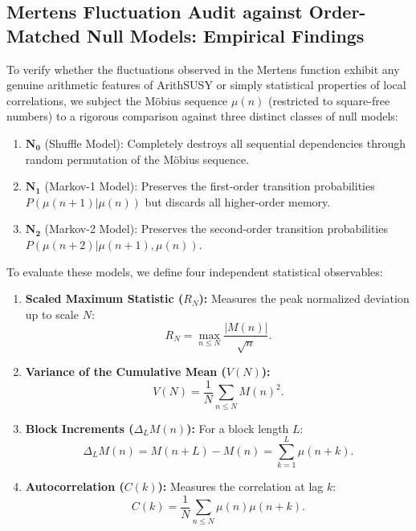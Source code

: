 \documentclass[11pt,a4paper]{article}
\theoremstyle{definition}
\begin{document}
	\subsection{Mertens Fluctuation Audit against Order-Matched Null Models: Empirical Findings}
	To verify whether the fluctuations observed in the Mertens function exhibit any genuine arithmetic features of ArithSUSY or simply statistical properties of local correlations, we subject the Möbius sequence $\mu(n)$ (restricted to square-free numbers) to a rigorous comparison against three distinct classes of null models:
	\begin{enumerate}
		\item $\mathbf{N_0}$ (Shuffle Model): Completely destroys all sequential dependencies through random permutation of the Möbius sequence.
		\item $\mathbf{N_1}$ (Markov-1 Model): Preserves the first-order transition probabilities $P(\mu(n+1) | \mu(n))$ but discards all higher-order memory.
		\item $\mathbf{N_2}$ (Markov-2 Model): Preserves the second-order transition probabilities $P(\mu(n+2) | \mu(n+1), \mu(n))$.
	\end{enumerate}
	
	To evaluate these models, we define four independent statistical observables:
	\begin{enumerate}
		\item \textbf{Scaled Maximum Statistic ($R_N$):} Measures the peak normalized deviation up to scale $N$:
		\begin{equation}
			R_N = \max_{n \le N} \frac{|M(n)|}{\sqrt{n}}.
		\end{equation}
		\item \textbf{Variance of the Cumulative Mean ($V(N)$):}
		\begin{equation}
			V(N) = \frac{1}{N} \sum_{n \le N} M(n)^2.
		\end{equation}
		\item \textbf{Block Increments ($\Delta_L M(n)$):} For a block length $L$:
		\begin{equation}
			\Delta_L M(n) = M(n+L) - M(n) = \sum_{k=1}^L \mu(n+k).
		\end{equation}
		\item \textbf{Autocorrelation ($C(k)$):} Measures the correlation at lag $k$:
		\begin{equation}
			C(k) = \frac{1}{N} \sum_{n \le N} \mu(n)\mu(n+k).
		\end{equation}
	\end{enumerate}
	
\end{document}
